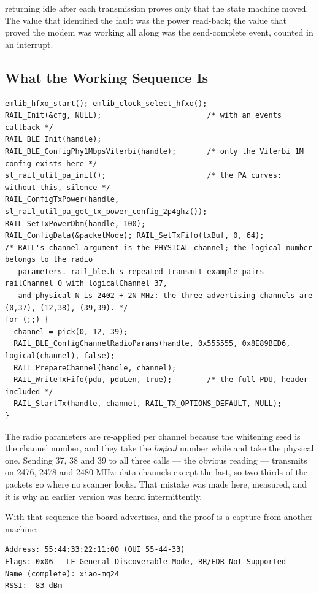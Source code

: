  returning idle after each transmission proves only that the state
machine moved. The value that identified the fault was the power read-back; the value that proved the
modem was working all along was the send-complete event, counted in an interrupt.

\subsection{What the Working Sequence Is}

\begin{verbatim}
emlib_hfxo_start(); emlib_clock_select_hfxo();
RAIL_Init(&cfg, NULL);                        /* with an events callback */
RAIL_BLE_Init(handle);
RAIL_BLE_ConfigPhy1MbpsViterbi(handle);       /* only the Viterbi 1M config exists here */
sl_rail_util_pa_init();                       /* the PA curves: without this, silence */
RAIL_ConfigTxPower(handle, sl_rail_util_pa_get_tx_power_config_2p4ghz());
RAIL_SetTxPowerDbm(handle, 100);
RAIL_ConfigData(&packetMode); RAIL_SetTxFifo(txBuf, 0, 64);
/* RAIL's channel argument is the PHYSICAL channel; the logical number belongs to the radio
   parameters. rail_ble.h's repeated-transmit example pairs railChannel 0 with logicalChannel 37,
   and physical N is 2402 + 2N MHz: the three advertising channels are (0,37), (12,38), (39,39). */
for (;;) {
  channel = pick(0, 12, 39);
  RAIL_BLE_ConfigChannelRadioParams(handle, 0x555555, 0x8E89BED6, logical(channel), false);
  RAIL_PrepareChannel(handle, channel);
  RAIL_WriteTxFifo(pdu, pduLen, true);        /* the full PDU, header included */
  RAIL_StartTx(handle, channel, RAIL_TX_OPTIONS_DEFAULT, NULL);
}
\end{verbatim}

The radio parameters are re-applied per channel because the whitening seed is the channel number, and
they take the \emph{logical} number while  and 
take the physical one. Sending 37, 38 and 39 to all three calls --- the obvious reading --- transmits on
2476, 2478 and 2480 MHz: data channels except the last, so two thirds of the packets go where no scanner
looks. That mistake was made here, measured, and it is why an earlier version was heard intermittently.

With that sequence the board advertises, and the proof is a capture from another machine:

\begin{verbatim}
Address: 55:44:33:22:11:00 (OUI 55-44-33)
Flags: 0x06   LE General Discoverable Mode, BR/EDR Not Supported
Name (complete): xiao-mg24
RSSI: -83 dBm
\end{verbatim}

